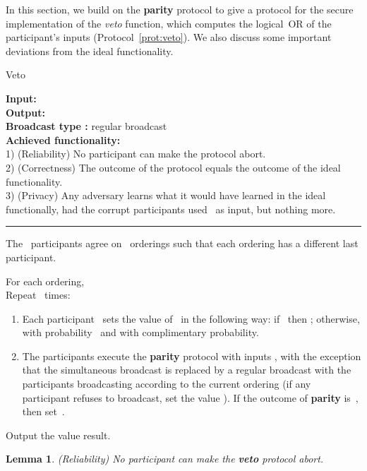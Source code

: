 \documentclass[11pt]{article}
\newtheorem{lemma}[theorem]{Lemma}
\begin{document}
In this section, we build on the \textbf{parity} protocol to give a
protocol for the secure implementation of the \emph{veto} function,
which computes the logical~OR of the participant's inputs
(Protocol~\ref{prot:veto}). We also discuss some important
deviations from the ideal functionality.
\begin{protocol} \caption{Veto} \label{prot:veto}
{\bf Input:}  \\
{\bf Output:}  \\
{\bf Broadcast type :} regular broadcast\\
{\bf Achieved functionality:} \\
1) (Reliability) No participant can make the protocol abort. \\
2) (Correctness) The outcome of the protocol equals the outcome of the ideal functionality. \\
3) (Privacy) Any adversary learns what it would have learned in the
ideal functionally, had the corrupt participants used~ as input,
but nothing more.

 \vspace{4pt} \hrule \vspace{4pt}

The~ participants agree on~ orderings such that each ordering
has a different last participant.




For each ordering,\\
\phantom{----}Repeat~ times: \hspace{1cm}\begin{enumerate}
\item \label{step:flip}Each participant~ sets the value of~ in the
following way: if~ then ; otherwise,  with
probability~ and  with complimentary
probability.
\item \label{veto:step2}The participants execute the
\textbf{parity} protocol with inputs , with
the exception that the simultaneous broadcast  is replaced by a
regular broadcast with the participants broadcasting according to
the current ordering (if any participant refuses to broadcast, set
the value ). If the outcome of
\textbf{parity} is~, then set \,.
\end{enumerate}
Output the value \textsf{result}.
\end{protocol}


\begin{lemma} \label{lemma:veto3}(Reliability)
No participant can make the \textbf{veto} protocol abort.
\end{lemma}
\end{document}
